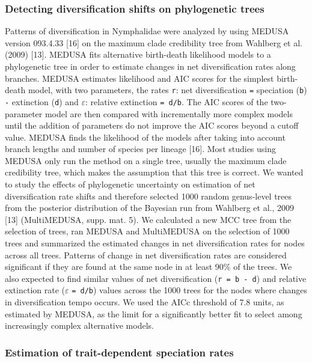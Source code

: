 \documentclass[10pt]{article}
\begin{document}
\subsubsection*{Detecting diversification shifts on phylogenetic
trees}

Patterns of diversification in Nymphalidae were analyzed by using MEDUSA
version 093.4.33 {[}16{]} on the maximum clade credibility tree from
Wahlberg et al. (2009) {[}13{]}. MEDUSA fits alternative birth-death
likelihood models to a phylogenetic tree in order to estimate changes in
net diversification rates along branches. MEDUSA estimates likelihood
and AIC scores for the simplest birth-death model, with two parameters,
the rates \texttt{r}: net diversification \texttt{=} speciation
(\texttt{b}) \texttt{-} extinction (\texttt{d}) and \(\varepsilon\):
relative extinction \texttt{= d/b}. The AIC scores of the two-parameter
model are then compared with incrementally more complex models until the
addition of parameters do not improve the AIC scores beyond a cutoff
value. MEDUSA finds the likelihood of the models after taking into
account branch lengths and number of species per lineage {[}16{]}. Most
studies using MEDUSA only run the method on a single tree, usually the
maximum clade credibility tree, which makes the assumption that this
tree is correct. We wanted to study the effects of phylogenetic
uncertainty on estimation of net diversification rate shifts and
therefore selected 1000 random genus-level trees from the posterior
distribution of the Bayesian run from Wahlberg et al., 2009 {[}13{]}
(MultiMEDUSA, supp. mat. 5). We calculated a new MCC tree from the
selection of trees, ran MEDUSA and MultiMEDUSA on the selection of 1000
trees and summarized the estimated changes in net diversification rates
for nodes across all trees. Patterns of change in net diversification
rates are considered significant if they are found at the same node in
at least 90\% of the trees. We also expected to find similar values of
net diversification (\texttt{r = b - d}) and relative extinction rate
(\(\varepsilon\) \texttt{= d/b}) values across the 1000 trees for the
nodes where changes in diversification tempo occurs. We used the AICc
threshold of 7.8 units, as estimated by MEDUSA, as the limit for a
significantly better fit to select among increasingly complex
alternative models.

\subsubsection*{Estimation of trait-dependent speciation
rates}
\end{document}
